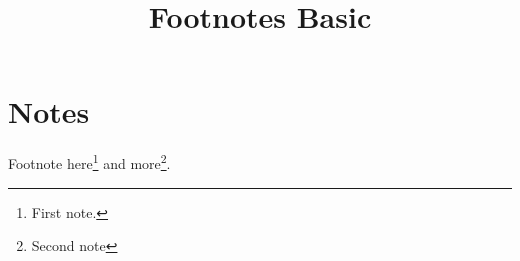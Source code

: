 \documentclass{article}
\begin{document}
\title{Footnotes Basic}\maketitle
\section{Notes} Footnote here\footnote{First note.} and more\footnote{Second note}.
\end{document}
